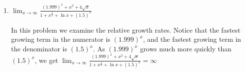 \documentclass{article}
\begin{document}
\begin{enumerate}
\begin{enumerate}

\vfill

\item $\displaystyle \lim_{x\to \infty} \frac{(1.999)^x + x^2 + 4\sqrt{x}}{1+ x^{\frac14}+\ln x +(1.5)^x}$

\begin{solution}
In this problem we examine the relative growth rates. Notice that the fastest growing term in the numerator is $(1.999)^x$, and the fastest growing term in the denominator is $(1.5)^x$. As $(1.999)^x$ grows much more quickly than $(1.5)^x$, we get $\displaystyle \lim_{x\to \infty} \frac{(1.999)^x + x^2 + 4\sqrt{x}}{1+ x^{\frac14}+\ln x +(1.5)^x}=\infty$
\end{solution}

\vfill

\end{enumerate}









\end{enumerate}
\end{document}
